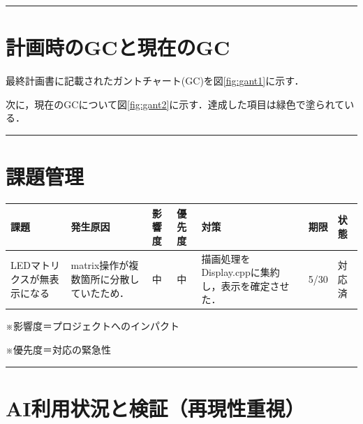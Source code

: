 \documentclass[uplatex,dvipdfmx,a4paper,11pt]{jsarticle}
\newcommand{\sectionrule}{\par\medskip\noindent\rule{\linewidth}{0.6pt}\par\medskip}
\begin{document}
\sectionrule

\section{計画時のGCと現在のGC}


最終計画書に記載されたガントチャート(GC)を図\ref{fig:gant1}に示す．


次に，現在のGCについて図\ref{fig:gant2}に示す．達成した項目は緑色で塗られている．



\sectionrule


\section{課題管理}

\begin{tabularx}{\linewidth}{@{}lXllXll@{}}
\toprule
課題 & 発生原因 & 影響度 & 優先度 & 対策 & 期限 & 状態 \\
\midrule
LEDマトリクスが無表示になる & matrix操作が複数箇所に分散していたため． & 中 & 中 & 描画処理をDisplay.cppに集約し，表示を確定させた． & 5/30 & 対応済 \\
\bottomrule
\end{tabularx}

\medskip
※影響度＝プロジェクトへのインパクト

※優先度＝対応の緊急性

\sectionrule


\section{AI利用状況と検証（再現性重視）}
\end{document}
